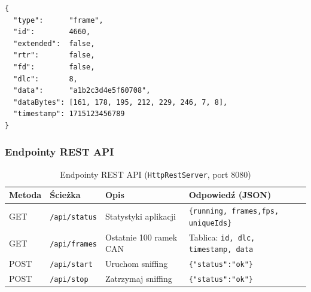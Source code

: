 \documentclass[12pt, a4paper]{article}
\begin{document}
\begin{lstlisting}[style=cpp, caption={Format JSON ramki CAN w strumieniu WebSocket}]
{
  "type":      "frame",
  "id":        4660,
  "extended":  false,
  "rtr":       false,
  "fd":        false,
  "dlc":       8,
  "data":      "a1b2c3d4e5f60708",
  "dataBytes": [161, 178, 195, 212, 229, 246, 7, 8],
  "timestamp": 1715123456789
}
\end{lstlisting}

\subsubsection*{Endpointy REST API}

\begin{table}[H]
\caption{Endpointy REST API (\texttt{HttpRestServer}, port 8080)}
\label{tab:restapi}
\centering
\small
\begin{tabular}{p{1.5cm}p{3.8cm}p{4.2cm}p{5.0cm}}
\toprule
\textbf{Metoda} & \textbf{Ścieżka} & \textbf{Opis} & \textbf{Odpowiedź (JSON)} \\
\midrule
GET  & \texttt{/api/status} & Statystyki aplikacji &
  \texttt{\{running, frames,\linebreak[4] fps, uniqueIds\}} \\
GET  & \texttt{/api/frames} & Ostatnie 100 ramek CAN &
  Tablica: \texttt{id, dlc, timestamp, data} \\
POST & \texttt{/api/start}  & Uruchom sniffing &
  \texttt{\{"status":"ok"\}} \\
POST & \texttt{/api/stop}   & Zatrzymaj sniffing &
  \texttt{\{"status":"ok"\}} \\
\bottomrule
\end{tabular}
\end{table}
\end{document}
